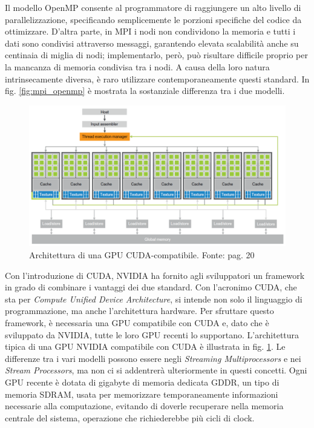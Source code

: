 Il modello OpenMP consente al programmatore di raggiungere un alto livello di parallelizzazione, specificando semplicemente le porzioni specifiche del codice da ottimizzare. D'altra parte, in MPI i nodi non condividono la memoria e tutti i dati sono condivisi attraverso messaggi, garantendo elevata scalabilità anche su centinaia di miglia di nodi; implementarlo, però, può risultare difficile proprio per la mancanza di memoria condivisa tra i nodi. A causa della loro natura intrinsecamente diversa, è raro utilizzare contemporaneamente questi standard. In fig. \ref{fig:mpi_openmp} è mostrata la sostanziale differenza tra i due modelli.

\begin{figure}[ht]
    \centering
    \includegraphics[width=.9\linewidth]{images/chapter2/cuda_arch.png}
    \caption{Architettura di una GPU CUDA-compatibile. Fonte: \cite[]{CUDA:Massive} pag. 20}
    \label{fig:cuda_arch}
\end{figure}

Con l'introduzione di \gls{CUDA}, NVIDIA ha fornito agli sviluppatori un framework in grado di combinare i vantaggi dei due standard. Con l'acronimo \gls{CUDA}, che sta per \textit{Compute Unified Device Architecture}, si intende non solo il linguaggio di programmazione, ma anche l'architettura hardware. Per sfruttare questo framework, è necessaria una \gls{GPU} compatibile con \gls{CUDA} e, dato che è sviluppato da NVIDIA, tutte le loro \gls{GPU} recenti lo supportano. L'architettura tipica di una \gls{GPU} NVIDIA compatibile con \gls{CUDA} è illustrata in fig. \ref{fig:cuda_arch}. Le differenze tra i vari modelli possono essere negli \textit{Streaming Multiprocessors} e nei \textit{Stream Processors}, ma non ci si addentrerà ulteriormente in questi concetti. Ogni \gls{GPU} recente è dotata di gigabyte di memoria dedicata \gls{GDDR}, un tipo di memoria \gls{SDRAM}, usata per memorizzare temporaneamente informazioni necessarie alla computazione, evitando di doverle recuperare nella memoria centrale del sistema, operazione che richiederebbe più cicli di clock.

